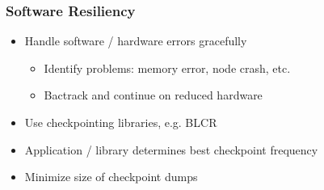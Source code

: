     \begin{frame}[fragile] \frametitle{Software Resiliency}
      \begin{itemize}
        \item Handle software / hardware errors gracefully
        \begin{itemize}
          \item Identify problems: memory error, node crash, etc.
          \item Bactrack and continue on reduced hardware
        \end{itemize}
        \item Use checkpointing libraries, e.g. BLCR
        \item Application / library determines best checkpoint frequency
        \item Minimize size of checkpoint dumps
      \end{itemize}
\end{frame}
